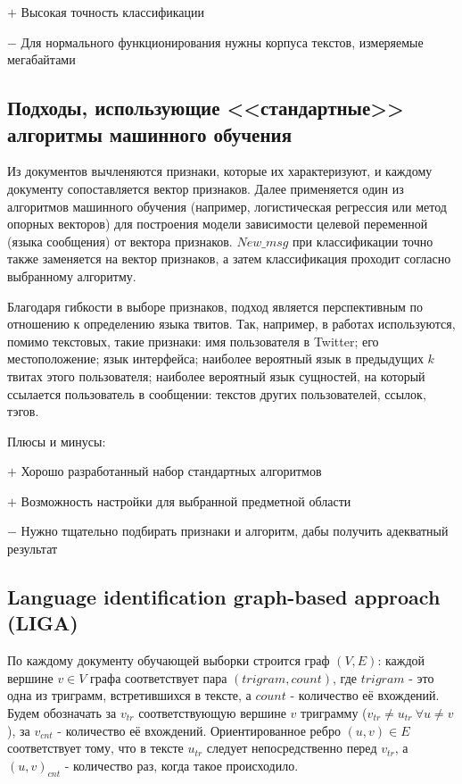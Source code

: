 \documentclass[a4paper, 14pt]{article}
\begin{document}
		$+$ Высокая точность классификации
		
		$-$ Для нормального функционирования нужны корпуса текстов, измеряемые мегабайтами
		
		\subsection{Подходы, использующие <<стандартные>> алгоритмы машинного обучения}
		Из документов вычленяются признаки, которые их характеризуют, и каждому документу сопоставляется вектор признаков. Далее применяется
		один из алгоритмов машинного обучения (например, логистическая регрессия или метод опорных векторов) для построения модели зависимости
		целевой переменной (языка сообщения) от вектора признаков. $New\_msg$ при классификации точно также заменяется на вектор признаков,
		а затем классификация проходит согласно выбранному алгоритму.
		
		Благодаря гибкости в выборе признаков, подход является перспективным по отношению к определению языка твитов. Так, например, в работах \cite{ppm} \cite{lrev}
		используются, помимо текстовых, такие признаки: имя пользователя в Twitter; его местоположение; язык интерфейса; наиболее вероятный
		язык в предыдущих $k$ твитах этого пользователя; наиболее вероятный язык сущностей, на который ссылается пользователь в сообщении: текстов
		других пользователей, ссылок, тэгов.
		
		\noindent Плюсы и минусы:
		
		$+$ Хорошо разработанный набор стандартных алгоритмов
		
		$+$ Возможность настройки для выбранной предметной области
		
		$-$ Нужно тщательно подбирать признаки и алгоритм, дабы получить адекватный результат
		
		\subsection{Language identification graph-based approach (LIGA)}
		По каждому документу обучающей выборки строится граф $(V, E)$:
		 каждой вершине $v \in V$ графа соответствует пара $(trigram, count)$, где $trigram$ - это одна
		из триграмм, встретившихся в тексте, а $count$ - количество её вхождений. Будем обозначать за $v_{tr}$ соответствующую вершине $v$ триграмму
		($v_{tr} \neq u_{tr} \ \forall u \neq v$), за $v_{cnt}$ - количество её вхождений. 
		Ориентированное ребро $(u, v) \in E$ соответствует тому, что в тексте $u_{tr}$ следует непосредственно
		перед $v_{tr}$, а $(u, v)_{cnt}$ - количество раз, когда такое происходило.
		
\end{document}
